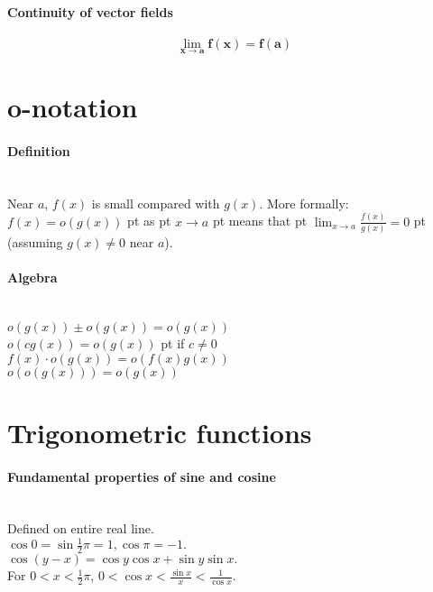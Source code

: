 \documentclass[10pt]{article}
\newcommand{\bs}[1]{\pmb{#1}}
\begin{document}
\paragraph{Continuity of vector fields}
\begin{equation*}
\lim_{\bs{x}\to\bs{a}}\bs{f}(\bs{x}) = \bs{f}(\bs{a})
\end{equation*}



\bigskip\bigskip
\section{o-notation}\smallskip

\paragraph{Definition}\ \\
Near $a$, $f(x)$ is small compared with $g(x)$.  More formally:\\
$f(x)=o(g(x))$  pt as  pt $x \to a$  pt means that  pt
$\lim_{x \to a}\frac{f(x)}{g(x)}=0$  pt (assuming $g(x) \neq 0$ near $a$).

\paragraph{Algebra}\ \\
$o(g(x))\pm o(g(x))=o(g(x))$\\
$o(cg(x))=o(g(x))$  pt if $c \neq 0$\\
$f(x) \cdot o(g(x))=o(f(x)g(x))$\\
$o(o(g(x)))=o(g(x))$



\bigskip\bigskip
\section{Trigonometric functions}\smallskip

\paragraph{Fundamental properties of sine and cosine}\ \\
Defined on entire real line.\\
$\cos 0 = \sin \frac{1}{2} \pi = 1, \cos \pi = -1.$\\
$\cos(y-x) = \cos y \cos x + \sin y \sin x.$\\
For $0 < x < \frac{1}{2} \pi$, $0 < \cos x < \frac{\sin x}{x} < \frac{1}{\cos x}.$
\end{document}
